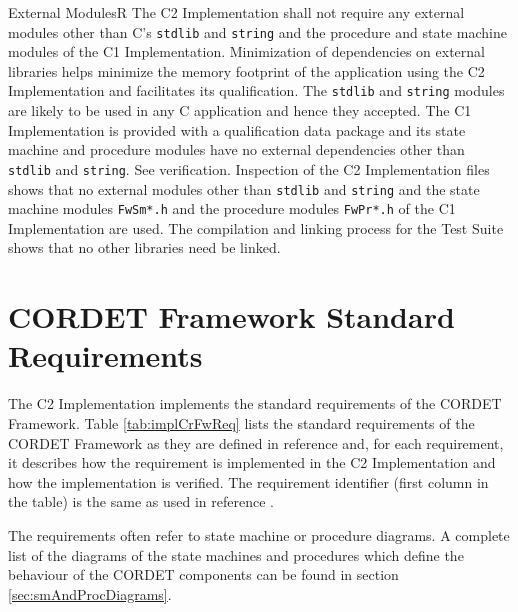 \documentclass{pnp_article}
\begin{document}
\begin{fwReq}{External Modules}{R}
{The C2 Implementation shall not require any external modules other than C's \texttt{stdlib} and \texttt{string} and the procedure and state machine modules of the C1 Implementation.}
{Minimization of dependencies on external libraries helps minimize the memory footprint of the application using the C2 Implementation and facilitates its qualification. The \texttt{stdlib} and \texttt{string} modules are likely to be used in any C application and hence they accepted. The C1 Implementation is provided with a qualification data package and its state machine and procedure modules have no external dependencies other than \texttt{stdlib} and \texttt{string}.}
{See verification.} 
{Inspection of the C2 Implementation files shows that no external modules other than \texttt{stdlib} and \texttt{string} and the state machine modules \texttt{FwSm*.h} and the procedure modules \texttt{FwPr*.h} of the C1 Implementation are used. The compilation and linking process for the Test Suite shows that no other libraries need be linked.}
\end{fwReq}



\appendix
\section{CORDET Framework Standard Requirements}\label{sec:implCrFwReq}
The C2 Implementation implements the standard requirements of the CORDET Framework. 
Table \ref{tab:implCrFwReq} lists the standard requirements of the CORDET Framework as they are defined in reference \cite{ref:cordetfw} and, for each requirement, it describes how the requirement is implemented in the C2 Implementation and how the implementation is verified. The requirement identifier (first column in the table) is the same as used in reference \cite{ref:cordetfw}.

The requirements often refer to state machine or procedure diagrams. A complete list of the diagrams of the state machines and procedures which define the behaviour of the CORDET components can be found in section \ref{sec:smAndProcDiagrams}.
\end{document}
